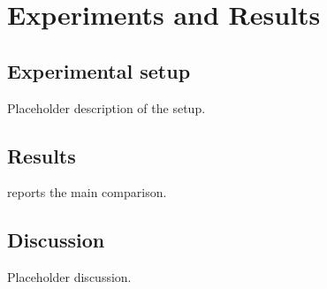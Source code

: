 \chapter{Experiments and Results}
\label{sec:experiments}

\section{Experimental setup}
\label{sec:setup}


Placeholder description of the setup.

\section{Results}
\label{sec:results}

%
%
%

 reports the main comparison.

\begin{table}
\centering
\caption[Heights of selected characters]{Heights of selected characters, in
centimetres and relative to the
tallest. A caption is a full sentence and states the units and the sample, so
the table can be read without hunting through the prose.}
\label{tab:example}

\end{table}

\section{Discussion}
\label{sec:discussion}

%

Placeholder discussion.
